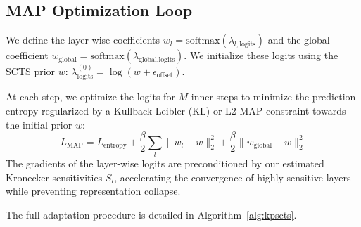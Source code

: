 \documentclass{article}
\theoremstyle{plain}
\theoremstyle{definition}
\theoremstyle{remark}
\begin{document}
\subsection{MAP Optimization Loop}
We define the layer-wise coefficients $w_l = \text{softmax}(\lambda_{l, \text{logits}})$ and the global coefficient $w_{\text{global}} = \text{softmax}(\lambda_{\text{global}, \text{logits}})$. We initialize these logits using the SCTS prior $w$: $\lambda_{\text{logits}}^{(0)} = \log(w + \epsilon_{\text{offset}})$. 

At each step, we optimize the logits for $M$ inner steps to minimize the prediction entropy regularized by a Kullback-Leibler (KL) or L2 MAP constraint towards the initial prior $w$:
\begin{equation}
L_{\text{MAP}} = L_{\text{entropy}} + \frac{\beta}{2} \sum_l \|w_l - w\|_2^2 + \frac{\beta}{2} \|w_{\text{global}} - w\|_2^2
\end{equation}
The gradients of the layer-wise logits are preconditioned by our estimated Kronecker sensitivities $S_l$, accelerating the convergence of highly sensitive layers while preventing representation collapse.

The full adaptation procedure is detailed in Algorithm~\ref{alg:kpscts}.
\end{document}
